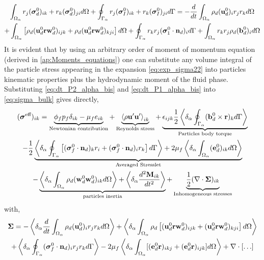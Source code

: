 \begin{multline}
    \int_{\Omega_\alpha}  r_{j}(\bm{\sigma}^0_d)_{ik}+r_{k}(\bm{\sigma}^0_d)_{ji} d\Omega
    +\oint_{\Gamma_\alpha}  r_{j}(\bm{\sigma}^0_I)_{ik}+r_{k}(\bm{\sigma}_I^0)_{ji} d\Gamma
    = 
    - \frac{d}{dt}\int_{\Omega_\alpha}  \rho_d (\textbf{u}_d^0)_i r_j r_k  d\Omega
    \\
    + \int_{\Omega_\alpha}  \left[
        \rho_d (\textbf{u}^0_d\textbf{r}\textbf{w}_d^0)_{ijk} + \rho_d (\textbf{u}^0_d\textbf{r}\textbf{w}_d^0)_{kji}
    \right] d\Omega
    +\oint_{\Gamma_\alpha}   r_{k}r_{j} (\bm{\sigma}_1^0\cdot\textbf{n}_d)_i  d\Gamma
    + \int_{\Omega_\alpha}  r_{k}r_{j}  \rho_d (\textbf{b}_d^0)_i  d\Omega 
    \label{eq:dt_P2_alpha_bis}
\end{multline}
It is evident that by using an arbitrary order of moment of momentum equation (derived in \ref{ap:Moments_equations}) one can substitute any volume integral of the particle stress appearing in the expansion \ref{eq:exp_sigma22} into particles kinematic properties plus the hydrodynamic moment of the fluid phase. 
Substituting \ref{eq:dt_P2_alpha_bis} and \ref{eq:dt_P1_alpha_bis} into \ref{eq:sigma_bulk} gives directly, 
\begin{multline}
    (\bm{\sigma}^\text{eff})_{ik}
    = 
    \underbrace{
        \phi_f p_f 
    \delta_{ik}
    - \mu_f e_{ik} 
    }_\text{Newtonian contribution}
    + \underbrace{\left<\rho\textbf{u}'\textbf{u}'\right>_{ik}}_\text{Reynolds stress}
    + \underbrace{\epsilon_{ijk} \frac{1}{2}\left<\delta_\alpha \oint_{\Gamma_\alpha}  (\textbf{b}_d^0 \times \textbf{r})_k d\Gamma\right>}_\text{Particles body torque}\\
    - \frac{1}{2}\underbrace{\left<\delta_\alpha \oint_{\Gamma_\alpha} \left[
        (\bm{\sigma}_f^0 \cdot \textbf{n}_d)_kr_i  
        + (\bm{\sigma}_f^0 \cdot \textbf{n}_d)_i r_k
    \right] d\Gamma\right>
    + 2 \mu_f \left<\delta_\alpha \int_{\Omega_\alpha} (\textbf{e}_d^0)_{ik} d\Omega\right>}_\text{Averaged Stresslet}\\
    - \underbrace{\left<\delta_\alpha \int_{\Omega_\alpha}  \rho_d (\textbf{w}_d^0\textbf{w}_d^0  )_{ik} d\Omega\right>
    + \left<\delta_\alpha \frac{d^2 \textbf{M}_{ik}}{dt^2}  \right>}_\text{particles inertia}
    + \underbrace{\frac{1}{2} (\mathbf{\nabla}\cdot\bm{\Sigma})_{ik}}_\text{Inhomogeneous stresses}
    \label{eq:stress_bulk_explicit}
\end{multline}
with,
\begin{multline}
    \bm{\Sigma}
    = 
    - \left<\delta_\alpha \frac{d}{dt}\int_{\Omega_\alpha}  \rho_d (\textbf{u}_d^0)_i r_j r_k  d\Omega\right>
    + \left<\delta_\alpha \int_{\Omega_\alpha}  
        \rho_d \left[
        (\textbf{u}^0_d\textbf{r}\textbf{w}_d^0)_{ijk} +  (\textbf{u}^0_d\textbf{r}\textbf{w}_d^0)_{kji}
    \right]
     d\Omega\right>\nonumber\\
    +\left<\delta_\alpha \oint_{\Gamma_\alpha}   (\bm{\sigma}_f^0 \cdot \textbf{n}_d)_i r_{j}  r_{k}   d\Gamma\right>
    - 2 \mu_f \left<\delta_\alpha \int_{\Omega_\alpha} [( \textbf{e}_d^0 \textbf{r})_{ikj}
    + ( \textbf{e}_d^0 \textbf{r})_{ijk}] d\Omega\right> + \mathbf{\nabla}\cdot[\ldots]
\end{multline}
